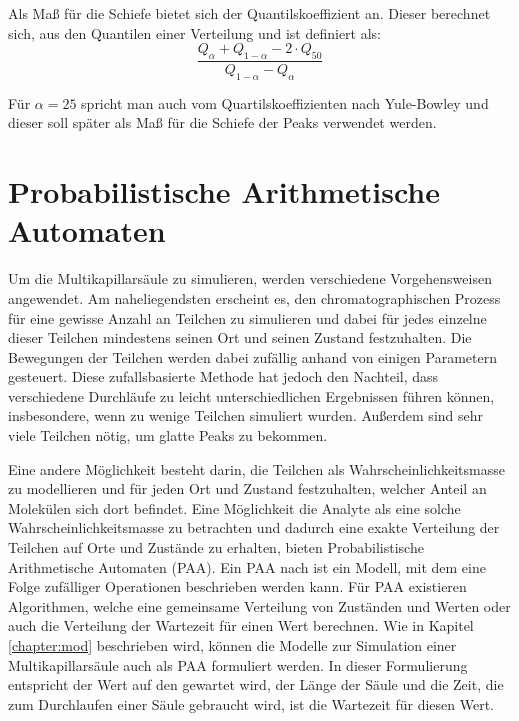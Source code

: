 Als Maß für die Schiefe bietet sich der Quantilskoeffizient \citep{johnson1994} an.
Dieser berechnet sich, aus den Quantilen einer Verteilung und ist definiert als: 
\begin{equation}
\frac{Q_{\alpha} + Q_{1-\alpha} -2\cdot Q_{50} }{ Q_{1-\alpha} - Q_{\alpha}}
\end{equation}

Für $\alpha = 25$ spricht man auch vom Quartilskoeffizienten nach Yule-Bowley und dieser soll später als Maß für die Schiefe der Peaks verwendet werden.


\section{Probabilistische Arithmetische Automaten}
Um die Multikapillarsäule zu simulieren, werden verschiedene Vorgehensweisen angewendet. Am naheliegendsten erscheint es, den chromatographischen Prozess für eine gewisse Anzahl an Teilchen zu simulieren und dabei für jedes einzelne dieser Teilchen mindestens seinen Ort und seinen Zustand festzuhalten. Die Bewegungen der Teilchen werden dabei zufällig anhand von einigen Parametern gesteuert. Diese zufallsbasierte Methode hat jedoch den Nachteil, dass verschiedene Durchläufe zu leicht unterschiedlichen Ergebnissen führen können, insbesondere, wenn zu wenige Teilchen simuliert wurden.
Außerdem sind sehr viele Teilchen nötig, um glatte Peaks zu bekommen.

Eine andere Möglichkeit besteht darin, die Teilchen als Wahrscheinlichkeitsmasse zu modellieren und für jeden Ort und Zustand festzuhalten, welcher Anteil an Molekülen sich dort befindet.
Eine Möglichkeit die Analyte als eine solche Wahrscheinlichkeitsmasse zu betrachten und dadurch eine exakte Verteilung der Teilchen auf Orte und Zustände zu erhalten, bieten Probabilistische Arithmetische Automaten (PAA).
Ein PAA nach \cite{MHKR} ist ein Modell, mit dem eine Folge zufälliger Operationen beschrieben werden kann. 
Für PAA existieren Algorithmen, welche eine gemeinsame Verteilung von Zuständen und Werten oder auch die Verteilung der Wartezeit für einen Wert berechnen. Wie in Kapitel \ref{chapter:mod} beschrieben wird, können die Modelle zur Simulation einer Multikapillarsäule auch als PAA formuliert werden. 
In dieser Formulierung entspricht der Wert auf den gewartet wird, der Länge der Säule und die Zeit, die zum Durchlaufen einer Säule gebraucht wird, ist die Wartezeit für diesen Wert. %

